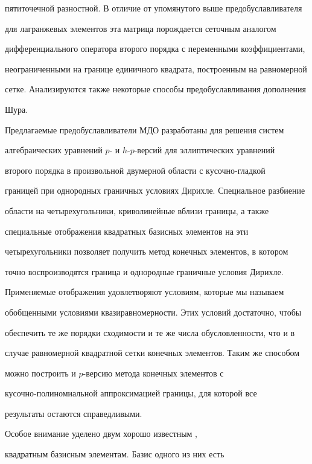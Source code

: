 пятиточечной разностной. В отличие от упомянутого выше предобуславливателя


для лагранжевых элементов эта матрица порождается сеточным аналогом


дифференциального оператора второго порядка с переменными коэффициентами,


неограниченными на границе единичного квадрата, построенным на равномерной


сетке. Анализируются также некоторые способы предобуславливания дополнения


Шура.





Предлагаемые предобуславливатели МДО разработаны для решения систем


алгебраических уравнений $p$- и $h$-$p$-версий для эллиптических уравнений


второго порядка в произвольной двумерной области с кусочно-гладкой


границей при однородных граничных условиях Дирихле. Специальное разбиение


области на четырехугольники, криволинейные вблизи границы, а также


специальные отображения квадратных базисных элементов на эти


четырехугольники позволяет получить метод конечных элементов, в котором


точно воспроизводятся граница и однородные граничные условия Дирихле.


Применяемые отображения удовлетворяют условиям, которые мы называем


обобщенными условиями квазиравномерности. Этих условий достаточно, чтобы


обеспечить те же порядки сходимости и те же числа обусловленности, что и в


случае равномерной квадратной сетки конечных элементов. Таким же способом


можно построить и $p$-версию метода конечных элементов с


кусочно-полиномиальной аппроксимацией границы, для которой все


результаты остаются справедливыми.





Особое внимание уделено двум хорошо известным \cite{ba-cr-ma-pi}, \cite{od}


квадратным базисным элементам. Базис одного из них есть


